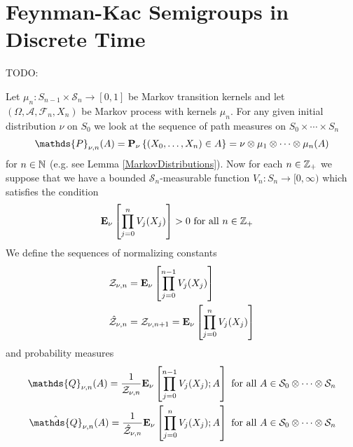\section{Feynman-Kac Semigroups in Discrete Time}
TODO:

Let $\mu_n : S_{n-1} \times \mathcal{S}_n \to [0,1]$ be Markov transition kernels and let $(\Omega, \mathcal{A}, \mathcal{F}_n, X_n)$ be Markov process with kernels $\mu_n$.  For any given initial distribution $\nu$ on $S_0$ we look at the sequence of path measures on $S_0 \times \dotsb \times S_n$
\begin{align*}
\mathds{P}_{\nu, n}(A) = \sprobability{(X_0, \dotsc, X_n) \in A}{\nu} = \nu \otimes \mu_1 \otimes \dotsb \otimes \mu_n(A)
\end{align*} for $n \in \mathbb{N}$ (e.g. see Lemma \ref{MarkovDistributions}).  Now for each $n \in \mathbb{Z}_+$ we suppose that we have a bounded $\mathcal{S}_n$-measurable function $V_n : S_n \to [0, \infty)$ which satisfies the condition
\begin{align*}
\textbf{E}_{\nu}\left [\prod_{j=0}^n V_j(X_j) \right] &> 0 \text{ for all $n \in \mathbb{Z}_+$}
\end{align*} 
We define the sequences of normalizing constants
\begin{align*}
\mathcal{Z}_{\nu, n} &= \textbf{E}_{\nu}\left [\prod_{j=0}^{n-1} V_j(X_j) \right] \\
\hat{\mathcal{Z}}_{\nu, n} &= \mathcal{Z}_{\nu, n+1} = \textbf{E}_{\nu}\left [\prod_{j=0}^{n} V_j(X_j) \right] \\
\end{align*}
and probability measures
\begin{align*}
\mathds{Q}_{\nu, n}(A) = \frac{1}{\mathcal{Z}_{\nu, n}} \sexpectation{\prod_{j=0}^{n-1} V_j(X_j) ; A}{\nu} \text{ for all $A \in \mathcal{S}_0 \otimes \dotsb \otimes \mathcal{S}_n$}\\
\hat{\mathds{Q}}_{\nu, n}(A) = \frac{1}{\hat{\mathcal{Z}}_{\nu, n}} \sexpectation{\prod_{j=0}^{n} V_j(X_j) ; A}{\nu} \text{ for all $A \in \mathcal{S}_0 \otimes \dotsb \otimes \mathcal{S}_n$}\\
\end{align*}

